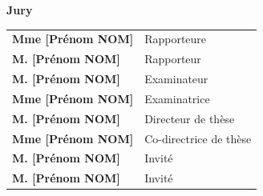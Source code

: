 \documentclass[a4paper,12pt]{article}
\begin{document}
\begin{center}
  {\large\textbf{Jury}}\\[3mm]
  \begin{tabular}{l l}
    \textbf{Mme [Prénom NOM]} & Rapporteure \\[2mm]
    \textbf{M. [Prénom NOM]} & Rapporteur \\[2mm]
    \textbf{M. [Prénom NOM]} & Examinateur \\[2mm]
    \textbf{Mme [Prénom NOM]} & Examinatrice \\[2mm]
    \textbf{M. [Prénom NOM]} & Directeur de thèse \\[2mm]
    \textbf{Mme [Prénom NOM]} & Co-directrice de thèse \\[2mm]
    \textbf{M. [Prénom NOM]} & Invité \\[2mm]
    \textbf{M. [Prénom NOM]} & Invité \\
  \end{tabular}
\end{center}

\vfill

\end{document}

